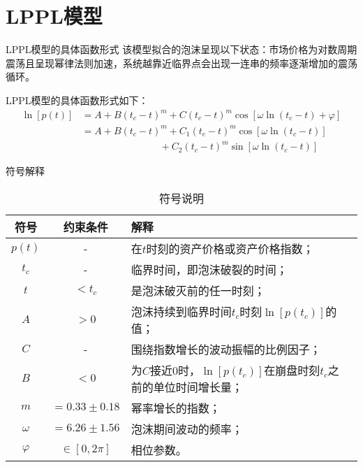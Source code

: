 \section{LPPL模型}
\begin{frame}[t]{LPPL模型的具体函数形式}
    该模型拟合的泡沫呈现以下状态：市场价格为对数周期震荡且呈现幂律法则加速，系统越靠近临界点会出现一连串的频率逐渐增加的震荡循环。

    LPPL模型的具体函数形式如下：
    \begin{align*}
        \ln\left[p(t)\right] &= A + B(t_c-t)^m + C(t_c-t)^m\cos\left[\omega\ln(t_c-t)+\varphi\right] \\
                             &= A + B(t_c-t)^m + C_1(t_c-t)^m\cos\left[\omega\ln(t_c-t)\right] \\
                             &\hspace{8em} + C_2(t_c-t)^m\sin\left[\omega\ln(t_c-t)\right]
    \end{align*}
\end{frame}

\begin{frame}[t]{符号解释}
    \begin{table}[H]
    \centering
        \begin{tabular}{@{}ccl@{}}
        \toprule
        符号        & 约束条件            & 解释                                          \\ \midrule
        $p(t)$    & -               & 在$t$时刻的资产价格或资产价格指数；                         \\
        $t_c$     & -               & 临界时间，即泡沫破裂的时间；                              \\
        $t$       & $<t_c$          & 是泡沫破灭前的任一时刻；                                \\
        $A$       & $>0$            & 泡沫持续到临界时间$t_c$时刻$\ln[p(t_c)]$的值；            \\
        $C$       & -               & 围绕指数增长的波动振幅的比例因子；                           \\
        $B$       & $<0$            & \tabincell{l}{为$C$接近0时，$\ln[p(t_c)]$在崩盘时刻$t_c$之\\前的单位时间增长量；} \\
        $m$       & $=0.33\pm 0.18$ & 幂率增长的指数；                                    \\
        $\omega$  & $=6.26\pm 1.56$ & 泡沫期间波动的频率；                                  \\
        $\varphi$ & $\in[0,2\pi]$   & 相位参数。                                       \\ \bottomrule
        \end{tabular}
        \caption{符号说明}\label{T:symbols}
    \end{table}
\end{frame}


